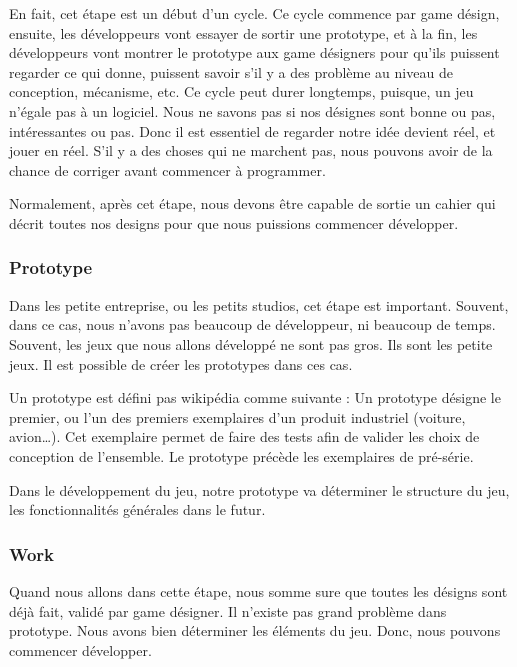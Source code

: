 En fait, cet étape est un début d'un cycle. Ce cycle commence par game désign, ensuite, les développeurs vont essayer de sortir une prototype, et à la fin, les développeurs vont montrer le prototype aux game désigners pour qu'ils puissent regarder ce qui donne, puissent savoir s'il y a des problème au niveau de conception, mécanisme, etc. Ce cycle peut durer longtemps, puisque, un jeu n'égale pas à un logiciel. Nous ne savons pas si nos désignes sont bonne ou pas, intéressantes ou pas. Donc il est essentiel de regarder notre idée devient réel, et jouer en réel. S'il y a des choses qui ne marchent pas, nous pouvons avoir de la chance de corriger avant commencer à programmer.

Normalement, après cet étape, nous devons être capable de sortie un cahier qui décrit toutes nos designs pour que nous puissions commencer développer.


\subsubsection{Prototype} %

Dans les petite entreprise, ou les petits studios, cet étape est important. Souvent, dans ce cas, nous n'avons pas beaucoup de développeur, ni beaucoup de temps. Souvent, les jeux que nous allons développé ne sont pas gros. Ils sont les petite jeux. Il est possible de créer les prototypes dans ces cas. 

Un prototype est défini pas wikipédia comme suivante : Un prototype désigne le premier, ou l'un des premiers exemplaires d'un produit industriel (voiture, avion…). Cet exemplaire permet de faire des tests afin de valider les choix de conception de l'ensemble. Le prototype précède les exemplaires de pré-série. 

Dans le développement du jeu, notre prototype va déterminer le structure du jeu, les fonctionnalités générales dans le futur. 


\subsubsection{Work} %

Quand nous allons dans cette étape, nous somme sure que toutes les désigns sont déjà fait, validé par game désigner. Il n'existe pas grand problème dans prototype. Nous avons bien déterminer les éléments du jeu. Donc, nous pouvons commencer développer. 

